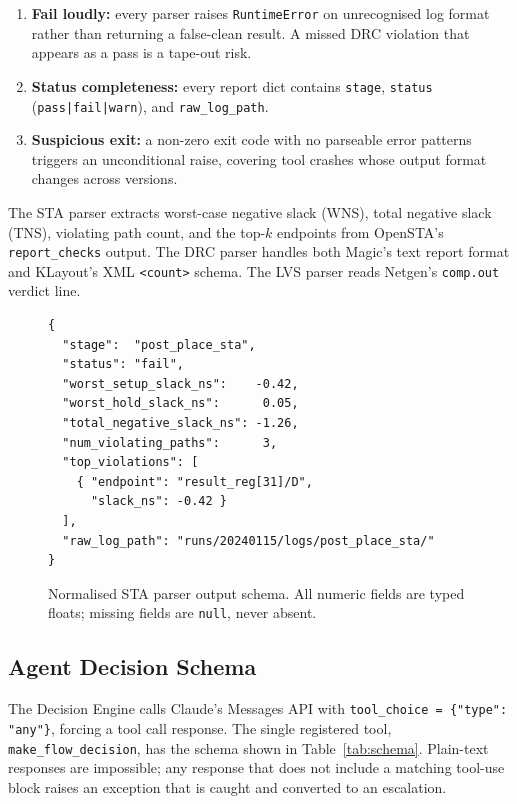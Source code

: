 \documentclass[conference]{IEEEtran}
\begin{document}
\begin{enumerate}
  \item \textbf{Fail loudly:} every parser raises \texttt{RuntimeError} on
        unrecognised log format rather than returning a false-clean result.
        A missed DRC violation that appears as a pass is a tape-out risk.
  \item \textbf{Status completeness:} every report dict contains
        \texttt{stage}, \texttt{status} (\texttt{pass|fail|warn}), and
        \texttt{raw\_log\_path}.
  \item \textbf{Suspicious exit:} a non-zero exit code with no parseable
        error patterns triggers an unconditional raise, covering tool
        crashes whose output format changes across versions.
\end{enumerate}

The STA parser extracts worst-case negative slack (WNS), total negative
slack (TNS), violating path count, and the top-$k$ endpoints from
OpenSTA's \texttt{report\_checks} output.
The DRC parser handles both Magic's text report format and KLayout's
XML \texttt{<count>} schema.
The LVS parser reads Netgen's \texttt{comp.out} verdict line.

\begin{figure}[t]
\centering
\begin{lstlisting}[style=jsonstyle]
{
  "stage":  "post_place_sta",
  "status": "fail",
  "worst_setup_slack_ns":    -0.42,
  "worst_hold_slack_ns":      0.05,
  "total_negative_slack_ns": -1.26,
  "num_violating_paths":      3,
  "top_violations": [
    { "endpoint": "result_reg[31]/D",
      "slack_ns": -0.42 }
  ],
  "raw_log_path": "runs/20240115/logs/post_place_sta/"
}
\end{lstlisting}
\caption{Normalised STA parser output schema. All numeric fields are
         typed floats; missing fields are \texttt{null}, never absent.}
\label{fig:schema}
\end{figure}

\subsection{Agent Decision Schema}

The Decision Engine calls Claude's Messages API with
\texttt{tool\_choice = \{"type": "any"\}}, forcing a tool call response.
The single registered tool, \texttt{make\_flow\_decision}, has the
schema shown in Table~\ref{tab:schema}.
Plain-text responses are impossible; any response that does not include
a matching tool-use block raises an exception that is caught and
converted to an escalation.
\end{document}
